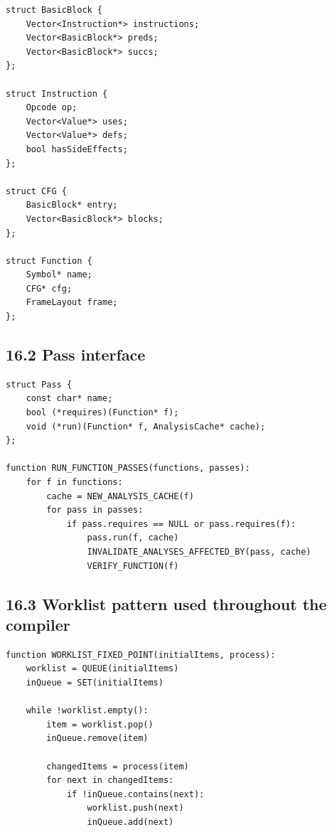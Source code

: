 \documentclass[10pt,letterpaper]{article}
\begin{document}
\begin{verbatim}
struct BasicBlock {
    Vector<Instruction*> instructions;
    Vector<BasicBlock*> preds;
    Vector<BasicBlock*> succs;
};

struct Instruction {
    Opcode op;
    Vector<Value*> uses;
    Vector<Value*> defs;
    bool hasSideEffects;
};

struct CFG {
    BasicBlock* entry;
    Vector<BasicBlock*> blocks;
};

struct Function {
    Symbol* name;
    CFG* cfg;
    FrameLayout frame;
};
\end{verbatim}

\subsection*{16.2 Pass interface}

\begin{verbatim}
struct Pass {
    const char* name;
    bool (*requires)(Function* f);
    void (*run)(Function* f, AnalysisCache* cache);
};

function RUN_FUNCTION_PASSES(functions, passes):
    for f in functions:
        cache = NEW_ANALYSIS_CACHE(f)
        for pass in passes:
            if pass.requires == NULL or pass.requires(f):
                pass.run(f, cache)
                INVALIDATE_ANALYSES_AFFECTED_BY(pass, cache)
                VERIFY_FUNCTION(f)
\end{verbatim}

\subsection*{16.3 Worklist pattern used throughout the compiler}

\begin{verbatim}
function WORKLIST_FIXED_POINT(initialItems, process):
    worklist = QUEUE(initialItems)
    inQueue = SET(initialItems)

    while !worklist.empty():
        item = worklist.pop()
        inQueue.remove(item)

        changedItems = process(item)
        for next in changedItems:
            if !inQueue.contains(next):
                worklist.push(next)
                inQueue.add(next)
\end{verbatim}
\end{document}
